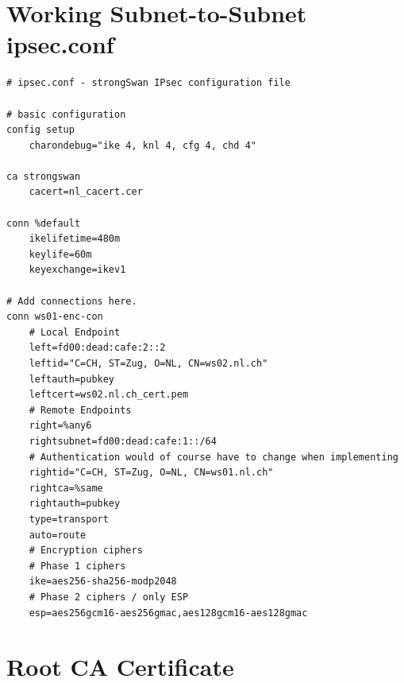 \documentclass[a4paper]{report}
\begin{document}
\chapter{Working Subnet-to-Subnet ipsec.conf}

\begin{lstlisting}
# ipsec.conf - strongSwan IPsec configuration file

# basic configuration
config setup
	charondebug="ike 4, knl 4, cfg 4, chd 4"

ca strongswan
	cacert=nl_cacert.cer

conn %default
	ikelifetime=480m
	keylife=60m
	keyexchange=ikev1

# Add connections here.
conn ws01-enc-con
	# Local Endpoint
	left=fd00:dead:cafe:2::2
	leftid="C=CH, ST=Zug, O=NL, CN=ws02.nl.ch"
	leftauth=pubkey
	leftcert=ws02.nl.ch_cert.pem
	# Remote Endpoints
	right=%any6
	rightsubnet=fd00:dead:cafe:1::/64
	# Authentication would of course have to change when implementing
	rightid="C=CH, ST=Zug, O=NL, CN=ws01.nl.ch"
	rightca=%same
	rightauth=pubkey
	type=transport
	auto=route
	# Encryption ciphers
	# Phase 1 ciphers
	ike=aes256-sha256-modp2048
	# Phase 2 ciphers / only ESP
	esp=aes256gcm16-aes256gmac,aes128gcm16-aes128gmac
\end{lstlisting}

\chapter{Root CA Certificate}
\end{document}

